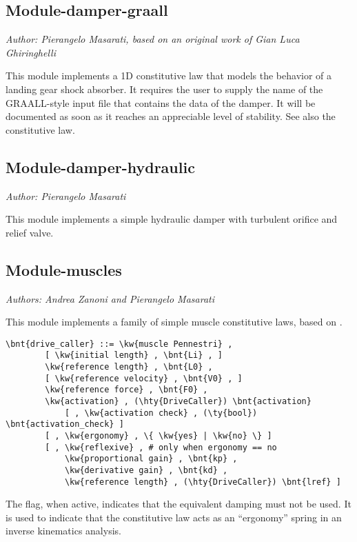 \subsection{Module-damper-graall}
\emph{Author: Pierangelo Masarati, based on an original work of Gian Luca Ghiringhelli}

This module implements a 1D constitutive law that models
the behavior of a landing gear shock absorber.
It requires the user to supply the name of the GRAALL-style 
input file that contains the data of the damper.
It will be documented as soon as it reaches an appreciable level
of stability.
See also the 
constitutive law.

\subsection{Module-damper-hydraulic}
\emph{Author: Pierangelo Masarati}

\noindent
This module implements a simple hydraulic damper with turbulent orifice and relief valve.

\subsection{Module-muscles}
\emph{Authors: Andrea Zanoni and Pierangelo Masarati}

\bigskip

\noindent
This module implements a family of simple muscle constitutive laws,
based on \cite{PENNESTRI-2007-JB}.
\begin{Verbatim}[commandchars=\\\{\}]
    \bnt{drive_caller} ::= \kw{muscle Pennestri} ,
        [ \kw{initial length} , \bnt{Li} , ]
        \kw{reference length} , \bnt{L0} ,
        [ \kw{reference velocity} , \bnt{V0} , ]
        \kw{reference force} , \bnt{F0} ,
        \kw{activation} , (\hty{DriveCaller}) \bnt{activation}
            [ , \kw{activation check} , (\ty{bool}) \bnt{activation_check} ]
        [ , \kw{ergonomy} , \{ \kw{yes} | \kw{no} \} ]
        [ , \kw{reflexive} , # only when ergonomy == no
            \kw{proportional gain} , \bnt{kp} ,
            \kw{derivative gain} , \bnt{kd} ,
            \kw{reference length} , (\hty{DriveCaller}) \bnt{lref} ]
\end{Verbatim}
The  flag, when active, indicates that the equivalent damping
must not be used.
It is used to indicate that the constitutive law acts as an ``ergonomy''
spring in an inverse kinematics analysis.

